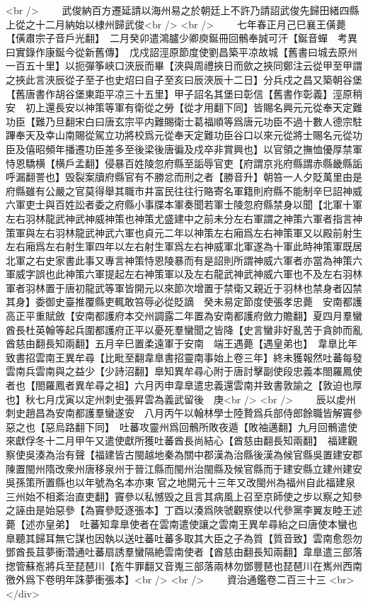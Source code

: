 <br />
　　武俊納百方遷延請以海州易之於朝廷上不許乃請詔武俊先歸田緒四縣上從之十二月納始以棣州歸武俊<br />
<br />
　　七年春正月己巳襄王僙薨【僙肅宗子音戶光翻】　二月癸卯遣鴻臚少卿庾鋋冊回鶻奉誠可汗【鋋音蟬　考異曰實錄作康鋋今從新舊傳】　戊戍詔涇原節度使劉昌築平凉故城【舊書曰城去原州一百五十里】以扼彈筝峽口浹辰而畢【浹與周禮挾日而歛之挾同鄭注云從甲至甲謂之挾此言浹辰從子至子也史炤曰自子至亥曰辰浹辰十二日】分兵戍之昌又築朝谷堡【舊唐書作胡谷堡東距平凉三十五里】甲子詔名其堡曰彰信【舊書作彰義】涇原稍安　初上還長安以神策等軍有衛從之勞【從才用翻下同】皆賜名興元元從奉天定難功臣【難乃旦翻宋白曰唐玄宗平内難賜衛士葛福順等爲唐元功臣不過十數人德宗駐蹕奉天及幸山南賜從駕立功將校爲元從奉天定難功臣谷口以來元從將士賜名元從功臣及僖昭頻年播遷功臣差多至後梁後唐徧及戍卒非賞興也】以官領之撫恤優厚禁軍恃恩驕横【横戶孟翻】侵暴百姓陵忽府縣至詬辱官吏【府謂京兆府縣謂赤縣畿縣詬呼漏翻詈也】毁裂案牘府縣官有不勝忿而刑之者【勝音升】朝笞一人夕貶萬里由是府縣雖有公嚴之官莫得舉其職市井富民往往行賂寄名軍籍則府縣不能制辛巳詔神威六軍吏士與百姓訟者委之府縣小事牒本軍奏聞若軍士陵忽府縣禁身以聞【北軍十軍左右羽林龍武神武神威神策也神策尤盛建中之前未分左右軍謂之神策六軍者指言神策軍與左右羽林龍武神武六軍也貞元二年以神策左右廂爲左右神策軍又以殿前射生左右廂爲左右射生軍四年以左右射生軍爲左右神威軍北軍遂為十軍此時神策軍既居北軍之右史家書此事又專言神策恃恩陵暴而有是詔則所謂神威六軍者亦當為神策六軍威字誤也此神策六軍提起左右神策軍以及左右龍武神武神威六軍也不及左右羽林軍者羽林置于唐初龍武等軍皆開元以來節次增置于禁衛又親近于羽林也禁身者囚禁其身】委御史臺推覆縣吏輒敢笞辱必從貶謫　癸未易定節度使張孝忠薨　安南都護高正平重賦斂【安南都護府本交州調露二年置為安南都護府斂力贍翻】夏四月羣蠻酋長杜英翰等起兵圍都護府正平以憂死羣蠻聞之皆降【史言蠻非好亂苦于貪帥而亂酋慈由翻長知兩翻】五月辛巳置柔遠軍于安南　端王遇薨【遇皇弟也】　韋臯比年致書招雲南王異牟尋【比毗至翻韋臯書招靈南事始上卷三年】終未獲報然吐蕃每發雲南兵雲南與之益少【少詩沼翻】臯知異牟尋心附于唐討擊副使段忠義本閤羅鳳使者也【閤羅鳳者異牟尋之祖】六月丙申韋臯遣忠義還雲南并致書敦諭之【敦迫也厚也】秋七月戊寅以定州刺史張昇雲為義武留後　庚<br />
<br />
　　辰以䖍州刺史趙昌為安南都護羣蠻遂安　八月丙午以翰林學士陸贄爲兵部侍郎餘職皆解竇參惡之也【惡烏路翻下同】　吐蕃攻靈州爲回鶻所敗夜遁【敗袖邁翻】九月回鶻遣使來獻俘冬十二月甲午又遣使獻所獲吐蕃酋長尚結心【酋慈由翻長知兩翻】　福建觀察使吳湊為治有聲【福建皆古閩越地秦為關中郡漢為治縣後漢為候官縣吳置建安郡陳置閩州隋改衆州唐移泉州于晉江縣而閩州治閩縣及候官縣而于建安縣立建州建安吳孫策所置縣也以年號為名本亦東官之地開元十三年又改閩州為福州自此福建泉三州始不相紊治直吏翻】竇參以私憾毁之且言其病風上召至京師使之步以察之知參之誣由是始惡參【為竇參貶逐張本】丁酉以湊爲陜虢觀察使以代參黨李翼友睦王述薨【述亦皇弟】　吐蕃知韋臯使者在雲南遣使讓之雲南王異牟尋紿之曰唐使本蠻也臯聽其歸耳無它謀也因執以送吐蕃吐蕃多取其大臣之子為質【質音致】雲南愈怨勿鄧酋長苴夢衝濳通吐蕃扇誘羣蠻隔絶雲南使者【酋慈由翻長知兩翻】韋臯遣三部落揔管蘇峞將兵至琵琶川【峞牛罪翻又音嵬三部落兩林勿鄧豐琶也琵琶川在嶲州西南徼外爲下卷明年誅夢衝張本】<br />
<br />
　　資治通鑑卷二百三十三  <br>
   </div> 

